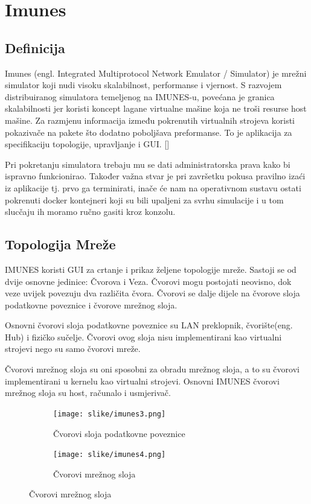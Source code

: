 \documentclass[times, utf8, zavrsni]{fer}
\begin{document}
\chapter{Imunes}
\section{Definicija}
Imunes (engl. Integrated Multiprotocol Network Emulator / Simulator)  je mrežni simulator koji nudi visoku skalabilnost, performanse i vjernost. S razvojem distribuiranog simulatora temeljenog na IMUNES-u, povećana je granica skalabilnosti jer koristi koncept lagane virtualne mašine koja ne troši resurse host mašine. Za razmjenu informacija između pokrenutih virtualnih strojeva koristi pokazivače na pakete što dodatno poboljšava preformanse. To je aplikacija za specifikaciju topologije, upravljanje i GUI. [\cite{imunes-def}] 

Pri pokretanju simulatora trebaju mu se dati administratorska prava kako bi ispravno funkcionirao. Također važna stvar je pri završetku pokusa pravilno izaći iz aplikacije tj. prvo ga terminirati, inače će nam na operativnom sustavu ostati pokrenuti docker kontejneri koji su bili upaljeni za svrhu simulacije i u tom slucčaju ih moramo ručno gasiti kroz konzolu. 

\section{Topologija Mreže}
IMUNES koristi GUI za crtanje i prikaz željene topologije mreže. Sastoji se od dvije osnovne jedinice: Čvorova i Veza.
Čvorovi mogu postojati neovisno, dok veze uvijek povezuju dva različita čvora.
Čvorovi se dalje dijele na čvorove sloja podatkovne poveznice i čvorove mrežnog sloja.

Osnovni čvorovi sloja podatkovne poveznice su LAN preklopnik, čvorište(eng. Hub) i fizičko sučelje.
Čvorovi ovog sloja nisu implementirani kao virtualni strojevi nego su samo čvorovi mreže.

Čvorovi mrežnog sloja su oni sposobni za obradu mrežnog sloja, a to su čvorovi implementirani u kernelu kao virtualni strojevi. Osnovni IMUNES čvorovi mrežnog sloja su host, računalo i usmjerivač.

\begin{figure}[htbp]
\centering
\begin{subfigure}[b]{0.5\textwidth}
    \texttt{[image: slike/imunes3.png]}
    \caption{Čvorovi sloja podatkovne poveznice}
    \label{fig:imunes1}
  \end{subfigure}
\begin{subfigure}[b]{0.5\textwidth}
    \texttt{[image: slike/imunes4.png]}
    \caption{Čvorovi mrežnog sloja}
    \label{fig:imunes2}
  \end{subfigure}
\end{figure}
\end{document}
